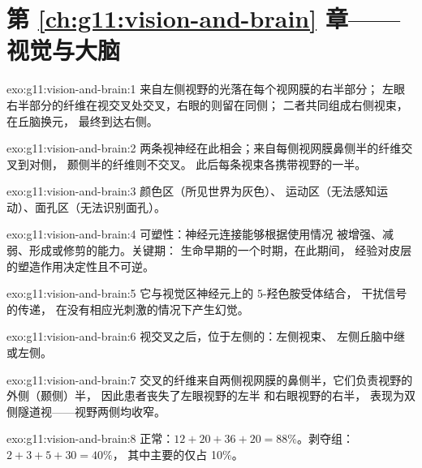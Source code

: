 \section*{第 \ref{ch:g11:vision-and-brain} 章——视觉与大脑}

\begin{solution}{exo:g11:vision-and-brain:1}
来自左侧视野的光落在每个视网膜的右半部分；
左眼右半部分的纤维在视交叉处交叉，右眼的则留在同侧；
二者共同组成右侧视束，
在丘脑换元，
最终到达右侧。
\end{solution}

\begin{solution}{exo:g11:vision-and-brain:2}
两条视神经在此相会；来自每侧视网膜鼻侧半的纤维交叉到对侧，
颞侧半的纤维则不交叉。
此后每条视束各携带视野的一半。
\end{solution}

\begin{solution}{exo:g11:vision-and-brain:3}
颜色区（所见世界为灰色）、
运动区（无法感知运动）、面孔区（无法识别面孔）。
\end{solution}

\begin{solution}{exo:g11:vision-and-brain:4}
可塑性：神经元连接能够根据使用情况
被增强、减弱、形成或修剪的能力。关键期：
生命早期的一个时期，在此期间，
经验对皮层的塑造作用决定性且不可逆。
\end{solution}

\begin{solution}{exo:g11:vision-and-brain:5}
它与视觉区神经元上的 5-羟色胺受体结合，
干扰信号的传递，
在没有相应光刺激的情况下产生幻觉。
\end{solution}

\begin{solution}{exo:g11:vision-and-brain:6}
视交叉之后，位于左侧的：左侧视束、
左侧丘脑中继或左侧。
\end{solution}

\begin{solution}{exo:g11:vision-and-brain:7}
交叉的纤维来自两侧视网膜的鼻侧半，它们负责视野的外侧（颞侧）半，
因此患者丧失了左眼视野的左半
和右眼视野的右半，
表现为双侧隧道视——视野两侧均收窄。
\end{solution}

\begin{solution}{exo:g11:vision-and-brain:8}
正常：$12 + 20 + 36 + 20 = 88\%$。剥夺组：$2 + 3 + 5 + 30 = 40\%$，
其中主要的仅占 10\%。
\end{solution}


